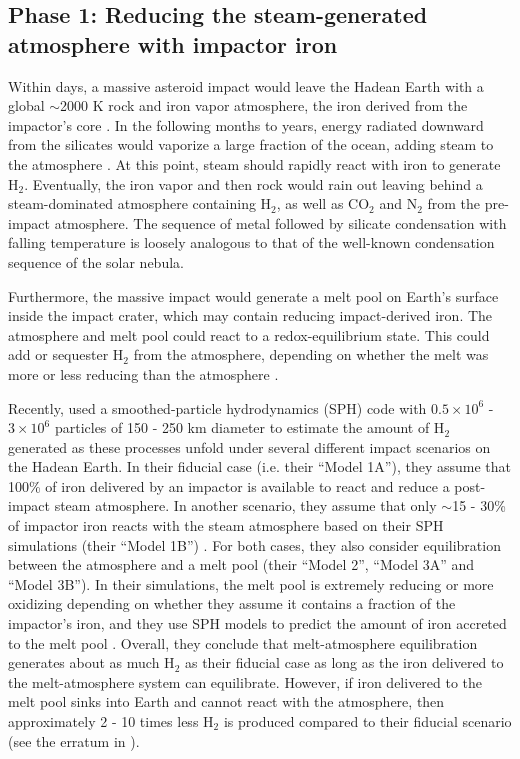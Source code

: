\subsection{Phase 1: Reducing the steam-generated atmosphere with impactor iron} \label{sec:phase1}

Within days, a massive asteroid impact would leave the Hadean Earth with a global $\sim$2000 K rock and iron vapor atmosphere, the iron derived from the impactor's core \citep{Itcovitz_2022}. In the following months to years, energy radiated downward from the silicates would vaporize a large fraction of the ocean, adding steam to the atmosphere \citep{Sleep_1989}. At this point, steam should rapidly react with iron to generate H$_2$. Eventually, the iron vapor and then rock would rain out leaving behind a steam-dominated atmosphere containing H$_2$, as well as CO$_2$ and N$_2$ from the pre-impact atmosphere. The sequence of metal followed by silicate condensation with falling temperature is loosely analogous to that of the well-known condensation sequence of the solar nebula.

Furthermore, the massive impact would generate a melt pool on Earth's surface inside the impact crater, which may contain reducing impact-derived iron. The atmosphere and melt pool could react to a redox-equilibrium state. This could add or sequester H$_2$ from the atmosphere, depending on whether the melt was more or less reducing than the atmosphere \citep{Itcovitz_2022}.

Recently, \citet{Itcovitz_2022} used a smoothed-particle hydrodynamics (SPH) code with $0.5 \times 10^6$ - $3 \times 10^6$ particles of 150 - 250 km diameter to estimate the amount of H$_2$ generated as these processes unfold under several different impact scenarios on the Hadean Earth. In their fiducial case (i.e. their ``Model 1A''), they assume that 100\% of iron delivered by an impactor is available to react and reduce a post-impact steam atmosphere. In another scenario, they assume that only $\sim$15 - 30\% of impactor iron reacts with the steam atmosphere based on their SPH simulations (their ``Model 1B'') \citep{Citron_2022}. For both cases, they also consider equilibration between the atmosphere and a melt pool (their ``Model 2'', ``Model 3A'' and ``Model 3B''). In their simulations, the melt pool is extremely reducing or more oxidizing depending on whether they assume it contains a fraction of the impactor's iron, and they use SPH models to predict the amount of iron accreted to the melt pool \citep{Citron_2022}. Overall, they conclude that melt-atmosphere equilibration generates about as much H$_2$ as their fiducial case as long as the iron delivered to the melt-atmosphere system can equilibrate. However, if iron delivered to the melt pool sinks into Earth and cannot react with the atmosphere, then approximately 2 - 10 times less H$_2$ is produced compared to their fiducial scenario (see the erratum in \citet{Itcovitz_2022}).

